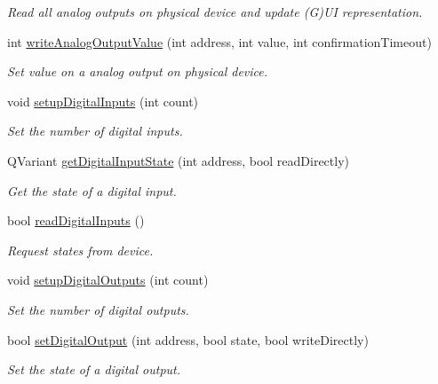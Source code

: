 \begin{DoxyCompactItemize}
\begin{DoxyCompactList}\small\item\em Read all analog outputs on physical device and update (G)UI representation. \end{DoxyCompactList}\item 
int \hyperlink{classmdt_device_modbus_aa130270b477df290a3f4ea120200b79f}{writeAnalogOutputValue} (int address, int value, int confirmationTimeout)
\begin{DoxyCompactList}\small\item\em Set value on a analog output on physical device. \end{DoxyCompactList}\item 
void \hyperlink{classmdt_device_modbus_a18a425c62e809d2f2940b1bba0ec521c}{setupDigitalInputs} (int count)
\begin{DoxyCompactList}\small\item\em Set the number of digital inputs. \end{DoxyCompactList}\item 
QVariant \hyperlink{classmdt_device_modbus_a467b1b7b17f80c410ff5fe5fa34bf0d2}{getDigitalInputState} (int address, bool readDirectly)
\begin{DoxyCompactList}\small\item\em Get the state of a digital input. \end{DoxyCompactList}\item 
bool \hyperlink{classmdt_device_modbus_a81cbcb4d10145d1bb9a8e0708ce4b74e}{readDigitalInputs} ()
\begin{DoxyCompactList}\small\item\em Request states from device. \end{DoxyCompactList}\item 
void \hyperlink{classmdt_device_modbus_af0eea185443f43cef5a3d9ed8d7a635e}{setupDigitalOutputs} (int count)
\begin{DoxyCompactList}\small\item\em Set the number of digital outputs. \end{DoxyCompactList}\item 
bool \hyperlink{classmdt_device_modbus_a42f6d4b2729c8e421895c6810e4cadf8}{setDigitalOutput} (int address, bool state, bool writeDirectly)
\begin{DoxyCompactList}\small\item\em Set the state of a digital output. \end{DoxyCompactList}\item 

\end{DoxyCompactItemize}
